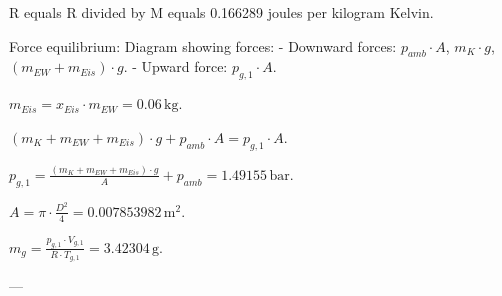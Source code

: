 R equals R divided by M equals 0.166289 joules per kilogram Kelvin.  

Force equilibrium:  
Diagram showing forces:  
- Downward forces: \( p_{amb} \cdot A \), \( m_K \cdot g \), \( (m_{EW} + m_{Eis}) \cdot g \).  
- Upward force: \( p_{g,1} \cdot A \).  

\( m_{Eis} = x_{Eis} \cdot m_{EW} = 0.06 \, \text{kg} \).  

\( (m_K + m_{EW} + m_{Eis}) \cdot g + p_{amb} \cdot A = p_{g,1} \cdot A \).  

\( p_{g,1} = \frac{(m_K + m_{EW} + m_{Eis}) \cdot g}{A} + p_{amb} = 1.49155 \, \text{bar} \).  

\( A = \pi \cdot \frac{D^2}{4} = 0.007853982 \, \text{m}^2 \).  

\( m_g = \frac{p_{g,1} \cdot V_{g,1}}{R \cdot T_{g,1}} = 3.42304 \, \text{g} \).  

---